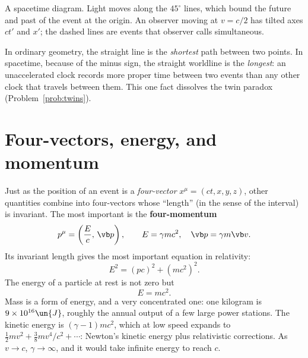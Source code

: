 \begin{center}
\begin{minipage}{\linewidth}\centering
{}

{\small A spacetime diagram. Light moves along the $45^\circ$ lines, which bound the future and past of the event at the origin. An observer moving at $v = c/2$ has tilted axes $ct'$ and $x'$; the dashed lines are events that observer calls simultaneous.}
\end{minipage}
\end{center}

\begin{keyidea}
In ordinary geometry, the straight line is the \emph{shortest} path between two points. In spacetime, because of the minus sign, the straight worldline is the \emph{longest}: an unaccelerated clock records more proper time between two events than any other clock that travels between them. This one fact dissolves the twin paradox (Problem~\ref{prob:twins}).
\end{keyidea}

\section{Four-vectors, energy, and momentum}

Just as the position of an event is a \emph{four-vector} $x^\mu = (ct,x,y,z)$, other quantities combine into four-vectors whose ``length'' (in the sense of the interval) is invariant. The most important is the \textbf{four-momentum}
\[
  p^\mu = \left(\frac{E}{c},\,\vb p\right), \qquad E = \gamma mc^2,\quad \vb p = \gamma m\vb v .
\]
Its invariant length gives the most important equation in relativity:
\[
  E^2 = (pc)^2 + (mc^2)^2 .
\]
The energy of a particle at rest is not zero but
\[
  E = mc^2 .
\]
Mass is a form of energy, and a very concentrated one: one kilogram is $9\times10^{16}\un{J}$, roughly the annual output of a few large power stations. The kinetic energy is $(\gamma-1)mc^2$, which at low speed expands to $\tfrac12mv^2 + \tfrac38mv^4/c^2+\cdots$: Newton's kinetic energy plus relativistic corrections. As $v\to c$, $\gamma\to\infty$, and it would take infinite energy to reach $c$.

